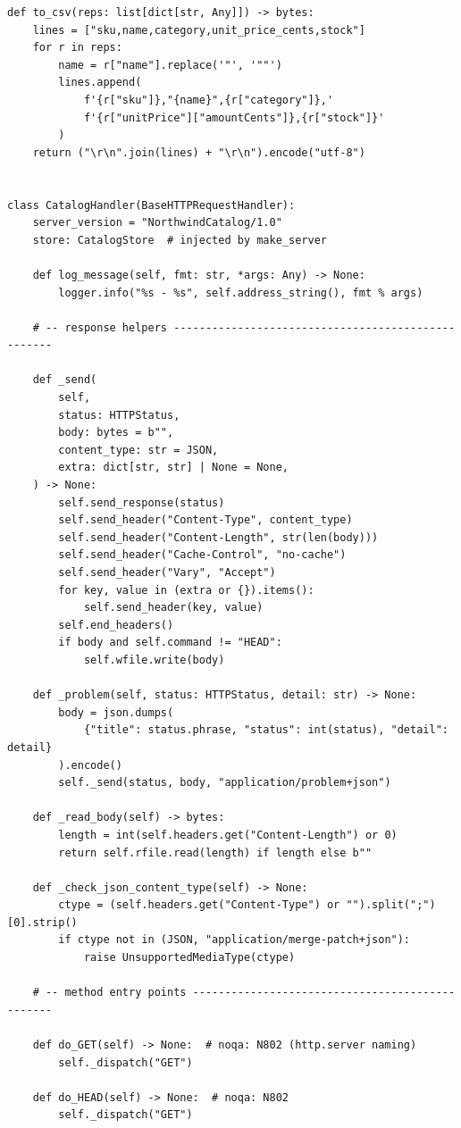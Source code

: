 \begin{verbatim}
def to_csv(reps: list[dict[str, Any]]) -> bytes:
    lines = ["sku,name,category,unit_price_cents,stock"]
    for r in reps:
        name = r["name"].replace('"', '""')
        lines.append(
            f'{r["sku"]},"{name}",{r["category"]},'
            f'{r["unitPrice"]["amountCents"]},{r["stock"]}'
        )
    return ("\r\n".join(lines) + "\r\n").encode("utf-8")


class CatalogHandler(BaseHTTPRequestHandler):
    server_version = "NorthwindCatalog/1.0"
    store: CatalogStore  # injected by make_server

    def log_message(self, fmt: str, *args: Any) -> None:
        logger.info("%s - %s", self.address_string(), fmt % args)

    # -- response helpers ---------------------------------------------------

    def _send(
        self,
        status: HTTPStatus,
        body: bytes = b"",
        content_type: str = JSON,
        extra: dict[str, str] | None = None,
    ) -> None:
        self.send_response(status)
        self.send_header("Content-Type", content_type)
        self.send_header("Content-Length", str(len(body)))
        self.send_header("Cache-Control", "no-cache")
        self.send_header("Vary", "Accept")
        for key, value in (extra or {}).items():
            self.send_header(key, value)
        self.end_headers()
        if body and self.command != "HEAD":
            self.wfile.write(body)

    def _problem(self, status: HTTPStatus, detail: str) -> None:
        body = json.dumps(
            {"title": status.phrase, "status": int(status), "detail": detail}
        ).encode()
        self._send(status, body, "application/problem+json")

    def _read_body(self) -> bytes:
        length = int(self.headers.get("Content-Length") or 0)
        return self.rfile.read(length) if length else b""

    def _check_json_content_type(self) -> None:
        ctype = (self.headers.get("Content-Type") or "").split(";")[0].strip()
        if ctype not in (JSON, "application/merge-patch+json"):
            raise UnsupportedMediaType(ctype)

    # -- method entry points ------------------------------------------------

    def do_GET(self) -> None:  # noqa: N802 (http.server naming)
        self._dispatch("GET")

    def do_HEAD(self) -> None:  # noqa: N802
        self._dispatch("GET")


\end{verbatim}
